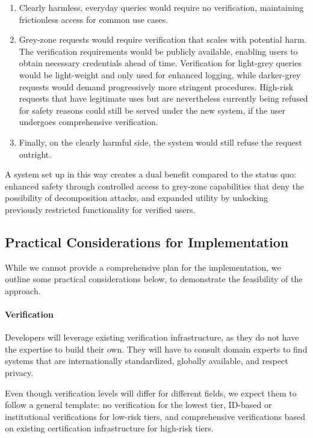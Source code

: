 \documentclass{article}
\theoremstyle{plain}
\theoremstyle{definition}
\theoremstyle{remark}
\begin{document}
\begin{enumerate}
  \item Clearly harmless, everyday queries would require no verification, maintaining frictionless access for common use cases.
  \item Grey-zone requests would require verification that scales with potential harm. The verification requirements would be publicly available, enabling users to obtain necessary credentials ahead of time. Verification for light-grey queries would be light-weight and only used for enhanced logging, while darker-grey requests would demand progressively more stringent procedures. High-risk requests that have legitimate uses but are nevertheless currently being refused for safety reasons could still be served under the new system, if the user undergoes comprehensive verification.
  \item Finally, on the clearly harmful side, the system would still refuse the request outright.
\end{enumerate}

A system set up in this way creates a dual benefit compared to the status quo: enhanced safety through controlled access to grey-zone capabilities that deny the possibility of decomposition attacks, and expanded utility by unlocking previously restricted functionality for verified users.

\subsection{Practical Considerations for Implementation}
\label{section:access-controls-future-work}

While we cannot provide a comprehensive plan for the implementation, we outline some practical considerations below, to demonstrate the feasibility of the approach.

\paragraph{Verification} Developers will leverage existing verification infrastructure, as they do not have the expertise to build their own.
They will have to consult domain experts to find systems that are internationally standardized, globally available, and respect privacy.

Even though verification levels will differ for different fields, we expect them to follow a general template: no verification for the lowest tier, ID-based or institutional verifications for low-risk tiers, and comprehensive verifications based on existing certification infrastructure for high-risk tiers.
\end{document}

